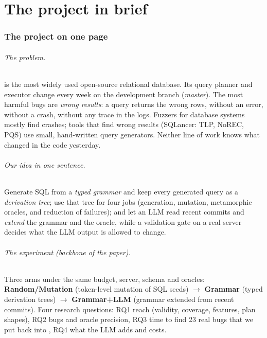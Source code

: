 \part{The project in brief}

\section{The project on one page}
\label{sec:onepage}

\paragraph{The problem.} \pg is the most widely used open-source relational
database. Its query planner and executor change every week on the
development branch (\emph{master}). The most harmful bugs are \emph{wrong
results}: a query returns the wrong rows, without an error, without a crash,
without any trace in the logs. Fuzzers for database systems mostly find
crashes; tools that find wrong results (SQLancer: TLP, NoREC, PQS) use small,
hand-written query generators. Neither line of work knows what changed in the
code yesterday.

\paragraph{Our idea in one sentence.} Generate SQL from a \emph{typed grammar}
and keep every generated query as a \emph{derivation tree}; use that tree for
four jobs (generation, mutation, metamorphic oracles, and reduction of
failures); and let an LLM read recent \pg commits and \emph{extend} the grammar
and the oracle, while a validation gate on a real server decides what the
LLM output is allowed to change.

\paragraph{The experiment (backbone of the paper).} Three arms under the same
budget, server, schema and oracles:
\textbf{Random/Mutation} (token-level mutation of SQL seeds) $\rightarrow$
\textbf{Grammar} (typed derivation trees) $\rightarrow$
\textbf{Grammar+LLM} (grammar extended from recent commits). Four research
questions: RQ1 reach (validity, coverage, features, plan shapes), RQ2 bugs
and oracle precision, RQ3 time to find 23 real bugs that we put back into \pg,
RQ4 what the LLM adds and costs.

